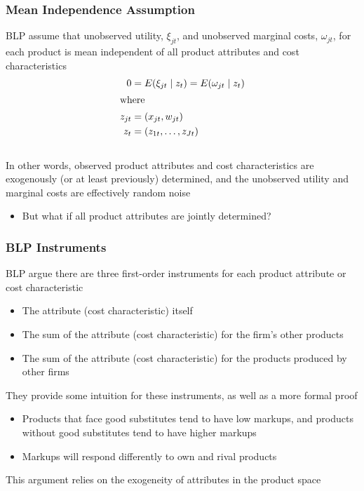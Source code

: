 \documentclass{beamer}
\begin{document}
\begin{frame}\frametitle{Mean Independence Assumption}
    BLP assume that unobserved utility, $\xi_{jt}$, and unobserved marginal costs, $\omega_{jt}$, for each product is mean independent of all product attributes and cost characteristics
    \begin{align*}
        0 &= E(\xi_{jt} \mid z_t) = E(\omega_{jt} \mid z_t) \\
        \intertext{where}
        z_{jt} &= (x_{jt}, w_{jt}) \\
        z_t &= (z_{1t}, \ldots, z_{Jt})
    \end{align*} \\
    \vspace{2ex}
    In other words, observed product attributes and cost characteristics are exogenously (or at least previously) determined, and the unobserved utility and marginal costs are effectively random noise
    \begin{itemize}
        \item But what if all product attributes are jointly determined?
    \end{itemize}
\end{frame}

\begin{frame}\frametitle{BLP Instruments}
    BLP argue there are three first-order instruments for each product attribute or cost characteristic
    \begin{itemize}
        \item The attribute (cost characteristic) itself
        \item The sum of the attribute (cost characteristic) for the firm's other products
        \item The sum of the attribute (cost characteristic) for the products produced by other firms
    \end{itemize}
    \vspace{2ex}
    They provide some intuition for these instruments, as well as a more formal proof
    \begin{itemize}
        \item Products that face good substitutes tend to have low markups, and products without good substitutes tend to have higher markups
        \item Markups will respond differently to own and rival products
    \end{itemize}
    \vspace{2ex}
    This argument relies on the exogeneity of attributes in the product space
\end{frame}
\end{document}
